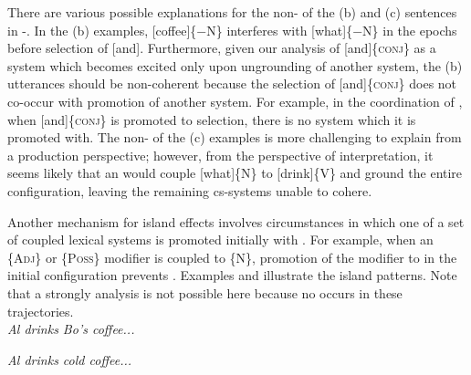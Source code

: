   There are various possible explanations for the non- of the (b) and (c) sentences in -. In the (b) examples, [coffee]\{−N\} interferes with [what]\{−N\} in the epochs before selection of [and]. Furthermore, given our analysis of [and]\{\textsc{conj}\} as a system which becomes excited only upon ungrounding of another system, the (b) utterances should be non-coherent because the selection of [and]\{\textsc{conj}\} does not co-occur with promotion of another system. For example, in the  coordination of , when [and]\{\textsc{conj}\} is promoted to selection, there is no system which it is promoted with. The non- of the (c) examples is more challenging to explain from a production perspective; however, from the perspective of interpretation, it seems likely that an  would couple [what]\{N\} to [drink]\{V\} and ground the entire configuration, leaving the remaining cs-systems unable to cohere.

Another mechanism for island effects involves circumstances in which one of a set of coupled lexical systems is promoted initially with . For example, when an \{A\textsc{dj}\} or \{P\textsc{oss}\} modifier is coupled to \{N\}, promotion of the modifier to  in the initial configuration prevents . Examples  and  illustrate the island patterns. Note that a strongly  analysis is not possible here because no  occurs in these trajectories.\\

\noindent \textit{Al drinks Bo's coffee...}
\label{ex:7:25}
    \label{ex:7:25a}
    \label{ex:7:25b}
\z
\z

\label{ex:7:26}
    \label{ex:7:26a}
    \label{ex:7:26b}
\z
\z

\noindent \textit{Al drinks cold coffee...}
\label{ex:7:27}
    \label{ex:7:27a}
    \label{ex:7:27b}
\z
\z

\label{ex:7:28}
    \label{ex:7:28a}
    \label{ex:7:28b}
\z
\z

